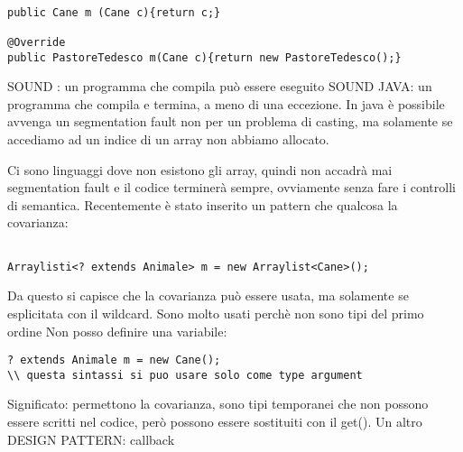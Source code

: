 \begin{lstlisting}[basicstyle=\small,]

public Cane m (Cane c){return c;}

@Override
public PastoreTedesco m(Cane c){return new PastoreTedesco();}

\end{lstlisting}

SOUND : un programma che compila può essere eseguito \newline
SOUND JAVA: un programma che compila e termina, a meno di una eccezione. \newline
In java è possibile avvenga un segmentation fault non per un problema di casting, ma solamente se accediamo ad un indice di un array non abbiamo allocato. \newline




Ci sono linguaggi dove non esistono gli array, quindi non accadrà mai segmentation fault e il codice terminerà sempre, ovviamente senza fare i controlli di semantica. \newline
Recentemente è stato inserito un pattern che qualcosa la covarianza: \newline


\begin{lstlisting}[basicstyle=\small,]

Arraylisti<? extends Animale> m = new Arraylist<Cane>();

\end{lstlisting}

Da questo si capisce che la covarianza può essere usata, ma solamente se esplicitata con il wildcard. \newline
Sono molto usati perchè non sono tipi del primo ordine \newline
Non posso definire una variabile: \newline

\begin{lstlisting}[basicstyle=\small,]
? extends Animale m = new Cane();
\\ questa sintassi si puo usare solo come type argument
\end{lstlisting}

Significato: permettono la covarianza, sono tipi temporanei che non possono essere scritti nel codice, però possono essere sostituiti con il get(). \newline
Un altro DESIGN PATTERN: callback















